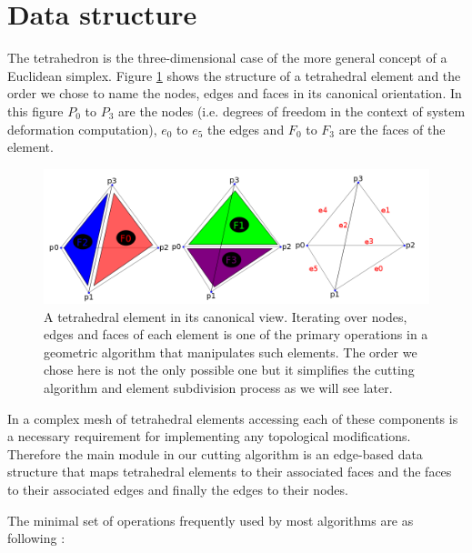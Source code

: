 \section{Data structure}
The tetrahedron is the three-dimensional case of the more general concept of a Euclidean simplex. 
Figure \ref{fig:tetconfig3} shows the structure of a tetrahedral element and the order we chose to 
name the nodes, edges and faces in its canonical orientation. In this figure $P_0$ to $P_3$ are
the nodes (i.e. degrees of freedom in the context of system deformation computation), $e_0$ to $e_5$ the edges 
and $F_0$ to $F_3$ are the faces of the element.

\begin{figure}[H]
  \centering
  \includegraphics[width=1.0\linewidth]{figures/cutting/tetconfig3.png}
  \caption{\label{fig:tetconfig3}
  {A tetrahedral element in its canonical view. Iterating over nodes, edges and faces of each element is
  one of the primary operations in a geometric algorithm that manipulates such elements. The order we chose here is not the
  only possible one but it simplifies the cutting algorithm and element subdivision process as we will see later.}
}
\end{figure}


In a complex mesh of tetrahedral elements accessing each of these components is a necessary requirement for 
implementing any topological modifications. Therefore the main module in our cutting algorithm is an edge-based
data structure that maps tetrahedral elements to their associated faces and the faces to their associated edges and
finally the edges to their nodes. 

The minimal set of operations frequently used by most algorithms are as following \cite{Mario2010PolygonMesh}:

